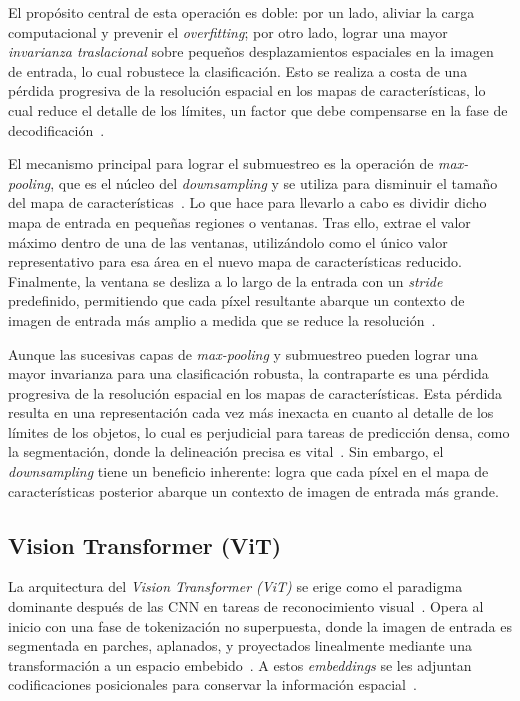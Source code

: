 El propósito central de esta operación es doble: por un lado, aliviar la carga computacional y prevenir el \textit{overfitting}; por otro lado, lograr una mayor \textit{invarianza traslacional} sobre pequeños desplazamientos espaciales en la imagen de entrada, lo cual robustece la clasificación. Esto se realiza a costa de una pérdida progresiva de la resolución espacial en los mapas de características, lo cual reduce el detalle de los límites, un factor que debe compensarse en la fase de decodificación~\cite{badrinarayanan2016segnet, ronneberger2015unet, bala2025visiontranscoder}.

El mecanismo principal para lograr el submuestreo es la operación de \textit{max-pooling}, que es el núcleo del \textit{downsampling} y se utiliza para disminuir el tamaño del mapa de características~\cite{ji2022automation, ronneberger2015unet}. Lo que hace para llevarlo a cabo es dividir dicho mapa de entrada en pequeñas regiones o ventanas. Tras ello, extrae el valor máximo dentro de una de las ventanas, utilizándolo como el único valor representativo para esa área en el nuevo mapa de características reducido. Finalmente, la ventana se desliza a lo largo de la entrada con un \textit{stride} predefinido, permitiendo que cada píxel resultante abarque un contexto de imagen de entrada más amplio a medida que se reduce la resolución~\cite{zhang2022constructionautomation, ji2022automation, badrinarayanan2016segnet}. 

Aunque las sucesivas capas de \textit{max-pooling} y submuestreo pueden lograr una mayor invarianza para una clasificación robusta, la contraparte es una pérdida progresiva de la resolución espacial en los mapas de características. Esta pérdida resulta en una representación cada vez más inexacta en cuanto al detalle de los límites de los objetos, lo cual es perjudicial para tareas de predicción densa, como la segmentación, donde la delineación precisa es vital~\cite{badrinarayanan2016segnet, bala2025visiontranscoder}. Sin embargo, el \textit{downsampling} tiene un beneficio inherente: logra que cada píxel en el mapa de características posterior abarque un contexto de imagen de entrada más grande.

\subsection{Vision Transformer (ViT)}
La arquitectura del \textit{Vision Transformer (ViT)} se erige como el paradigma dominante después de las CNN en tareas de reconocimiento visual~\cite{liu2022convnext, khan2022transformersvision, bala2025visiontranscoder}. Opera al inicio con una fase de tokenización no superpuesta, donde la imagen de entrada es segmentada en parches, aplanados, y proyectados linealmente mediante una transformación a un espacio embebido~\cite{bala2025visiontranscoder}. A estos \textit{embeddings} se les adjuntan codificaciones posicionales para conservar la información espacial~\cite{bala2025visiontranscoder}.

